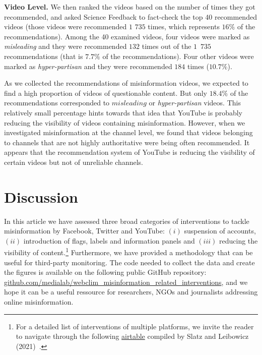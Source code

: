 \documentclass{article}
\begin{document}
\smallskip 

{\bf Video Level.} 
We then ranked the videos based on the number of times they got recommended, and asked Science Feedback to fact-check the top 40 recommended videos (those videos were recommended $1$ $735$ times, which represents $16\%$ of the recommendations).
Among the 40 examined videos, four videos were marked as {\it misleading} and they were recommended $132$ times out of the $1$~$735$ recommendations (that is $7.7\%$ of the recommendations).
Four other videos were marked as {\it hyper-partisan} and they were recommended $184$ times ($10.7\%$).

\smallskip 

As we collected the recommendations of misinformation videos, we expected to find a high proportion of videos of questionable content.
But only {$18.4\%$} of the recommendations corresponded to $misleading$ or {\it hyper-partisan} videos.
This relatively small percentage hints towards that idea that YouTube is probably reducing the visibility of videos containing misinformation.
However, when we investigated misinformation at the channel level, we found that videos belonging to channels that are not highly authoritative were being often recommended.
It appears that the recommendation system of YouTube is reducing the visibility of certain videos but not of unreliable channels.

\section{Discussion}

In this article we have assessed three broad categories of interventions to tackle misinformation by Facebook, Twitter and YouTube: $(i)$ suspension of accounts, $(ii)$ introduction of flags, labels and information panels and $(iii)$ reducing the visibility of content.\footnote{For a detailed list of interventions of multiple platforms, we invite the reader to navigate through the following \href{https://airtable.com/shrO0ooI9WSEfIUhb/tblAWQwFOiihKdQjm/viwZLAOzLK1NQ0c2n?blocks=hide}{airtable} compiled by Slatz and Leibowicz (2021)~\cite{niemanlab}.}
Furthermore, we have provided a methodology that can be useful for third-party monitoring. 
The code needed to collect the data and create the figures is available on the following public GitHub repository: \href{https://github.com/medialab/webclim_misinformation_related_interventions}{github.com/medialab/webclim\_misinformation\_related\_interventions}, and we hope it can be a useful ressource for researchers, NGOs and journalists addressing online misinformation. 
\end{document}
